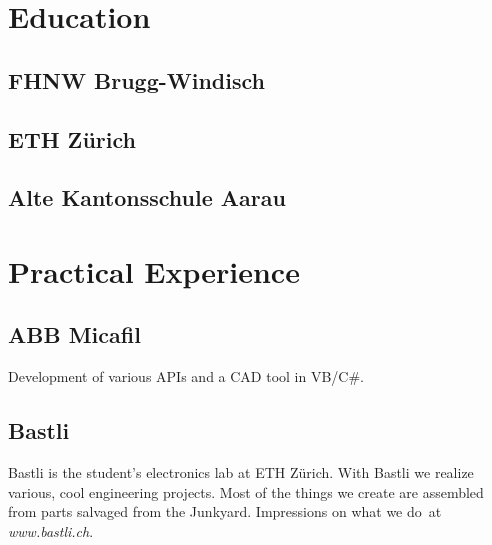 \documentclass[]{resume}
\begin{document}
\begin{timeline}


\section{Education}

\subsection{FHNW Brugg-Windisch}
\sectionsep

\subsection{ETH Zürich}
\sectionsep

\subsection{Alte Kantonsschule Aarau}
\sectionsep


\section{Practical Experience}

\subsection{ABB Micafil}
Development of various APIs and a CAD tool in VB/C\#.
\sectionsep

\subsection{Bastli}
Bastli is the student's electronics lab at ETH Zürich.
With Bastli we realize various, cool engineering projects. Most of the things we create are assembled from parts salvaged from the Junkyard.
Impressions on what we do at \textit{www.bastli.ch}.
\sectionsep


\end{timeline}
\end{document}

